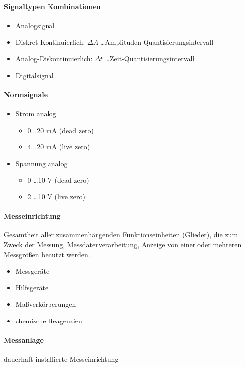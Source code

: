 \documentclass[a4paper]{scrartcl}
\begin{document}
\paragraph{Signaltypen Kombinationen}
\begin{itemize}
\item Analogsignal
\item Diskret-Kontinuierlich: $\Delta A$ \dots Amplituden-Quantisierungsintervall
\item Analog-Diskontinuierlich: $\Delta t$ \dots Zeit-Quantisierungsintervall
\item Digitalsignal
\end{itemize}


\paragraph{Normsignale}
\begin{itemize}
\item Strom analog
\begin{itemize}
\item $0 \dots 20$ mA (dead zero)
\item $4 \dots 20$ mA (live zero)
\end{itemize}
\item Spannung analog
    \begin{itemize}
    \item 0 \dots 10 V (dead zero)
    \item 2 \dots 10 V (live zero)
    \end{itemize}
\end{itemize}

\paragraph{Messeinrichtung} Gesamtheit aller zusammenhängenden Funktionseinheiten (Glieder), die zum Zweck der Messung, Messdatenverarbeitung, Anzeige von einer oder mehreren Messgrößen benutzt werden.
\begin{itemize}
\item Messgeräte
\item Hilfsgeräte
\item Maßverkörperungen
\item chemische Reagenzien
\end{itemize}

\paragraph{Messanlage} dauerhaft installierte Messeinrichtung
\end{document}
